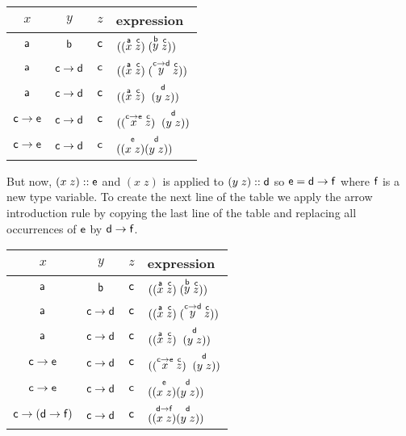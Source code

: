 \documentclass[11pt]{article}
\begin{document}
\begin{center}
\begin{tabular}{ccc|l}
$x$ & $y$ & $z$ & expression \\\hline{}
${\sf{a}}$ & ${\sf{b}}$ & ${\sf{c}}$ &$((\stackrel{{\sf{a}}}{x} \; \stackrel{{\sf{c}}}{z})\; (\stackrel{{\sf{b}}}{y} \; \stackrel{{\sf{c}}}{z}))$ \\
${\sf{a}}$ & ${\sf{c}}\rightarrow{}{\sf{d}}$ & ${\sf{c}}$ &$((\stackrel{{\sf{a}}}{x} \; \stackrel{{\sf{c}}}{z})\; (\stackrel{{\sf{c}}\rightarrow{}{\sf{d}}}{y} \; \stackrel{{\sf{c}}}{z}))$ \\
${\sf{a}}$ & ${\sf{c}}\rightarrow{}{\sf{d}}$ & ${\sf{c}}$ &$((\stackrel{{\sf{a}}}{x} \; \stackrel{{\sf{c}}}{z})\; \stackrel{{\sf{d}}}{(y\;z)})$ \\
${\sf{c}}\rightarrow{\sf{e}}$ & ${\sf{c}}\rightarrow{}{\sf{d}}$ & ${\sf{c}}$ &$((\stackrel{{\sf{c}}\rightarrow{\sf{e}}}{x} \; \stackrel{{\sf{c}}}{z})\; \stackrel{{\sf{d}}}{(y\;z)})$ \\
${\sf{c}}\rightarrow{\sf{e}}$ & ${\sf{c}}\rightarrow{}{\sf{d}}$ & ${\sf{c}}$ &$(\stackrel{{\sf{e}}}{(x\;z)} \stackrel{{\sf{d}}}{(y\;z)})$ \\
\end{tabular}
\end{center}
But now, $(x\;z)::{\sf{e}}$ and $(x\;z)$ is applied to $(y\;z)::{\sf{d}}$ so
${\sf{e}}={\sf{d}}\rightarrow{\sf{f}}$ where ${\sf{f}}$ is a new type variable. To create the
next line of the table we apply the arrow introduction rule by copying the last
line of the table and replacing all occurrences of ${\sf{e}}$ by
${\sf{d}}\rightarrow{\sf{f}}$.
\begin{center}
\begin{tabular}{ccc|l}
$x$ & $y$ & $z$ & expression \\\hline{}
${\sf{a}}$ & ${\sf{b}}$ & ${\sf{c}}$ &$((\stackrel{{\sf{a}}}{x} \; \stackrel{{\sf{c}}}{z})\; (\stackrel{{\sf{b}}}{y} \; \stackrel{{\sf{c}}}{z}))$ \\
${\sf{a}}$ & ${\sf{c}}\rightarrow{}{\sf{d}}$ & ${\sf{c}}$ &$((\stackrel{{\sf{a}}}{x} \; \stackrel{{\sf{c}}}{z})\; (\stackrel{{\sf{c}}\rightarrow{}{\sf{d}}}{y} \; \stackrel{{\sf{c}}}{z}))$ \\
${\sf{a}}$ & ${\sf{c}}\rightarrow{}{\sf{d}}$ & ${\sf{c}}$ &$((\stackrel{{\sf{a}}}{x} \; \stackrel{{\sf{c}}}{z})\; \stackrel{{\sf{d}}}{(y\;z)})$ \\
${\sf{c}}\rightarrow{\sf{e}}$ & ${\sf{c}}\rightarrow{}{\sf{d}}$ & ${\sf{c}}$ &$((\stackrel{{\sf{c}}\rightarrow{\sf{e}}}{x} \; \stackrel{{\sf{c}}}{z})\; \stackrel{{\sf{d}}}{(y\;z)})$ \\
${\sf{c}}\rightarrow{\sf{e}}$ & ${\sf{c}}\rightarrow{}{\sf{d}}$ & ${\sf{c}}$ &$(\stackrel{{\sf{e}}}{(x\;z)} \stackrel{{\sf{d}}}{(y\;z)})$ \\
${\sf{c}}\rightarrow({\sf{d}}\rightarrow{}{\sf{f}})$ & ${\sf{c}}\rightarrow{}{\sf{d}}$ & ${\sf{c}}$ &$(\stackrel{{\sf{d}}\rightarrow{\sf{f}}}{(x\;z)} \stackrel{{\sf{d}}}{(y\;z)})$ \\
\end{tabular}
\end{center}
\end{document}
